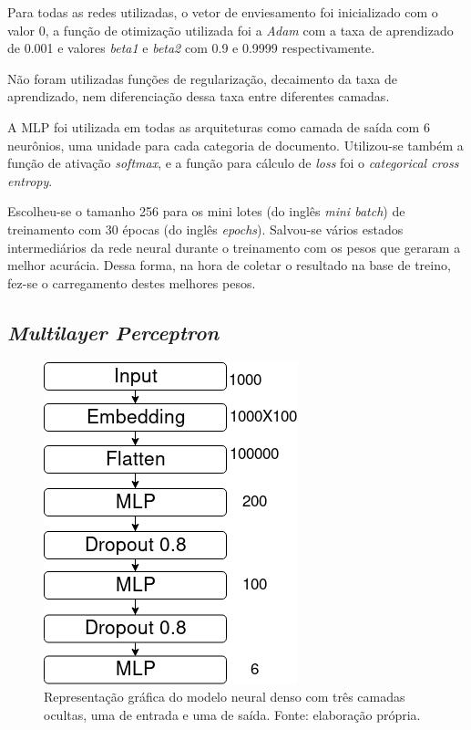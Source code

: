 Para todas as redes utilizadas, o vetor de enviesamento foi inicializado com o valor 0, a função de otimização utilizada foi a \textit{Adam} com a taxa de aprendizado
de 0.001 e valores \textit{beta1} e \textit{beta2} com 0.9 e 0.9999 respectivamente. 

Não foram utilizadas funções de regularização, decaimento da taxa de
aprendizado, nem diferenciação dessa taxa entre diferentes camadas.

A MLP foi utilizada em todas as arquiteturas como camada de saída com 6 neurônios, uma
unidade para cada categoria de documento. Utilizou-se também a função de ativação \textit{softmax},
e a função para cálculo de \textit{loss}  foi o \textit{categorical
cross entropy}.

Escolheu-se o tamanho 256 para os mini lotes (do inglês \textit{mini batch}) de treinamento com 30 épocas (do inglês \textit{epochs}). Salvou-se vários estados intermediários da rede neural durante o treinamento com os pesos que geraram a melhor acurácia. Dessa forma, na hora de coletar o resultado na base de treino, fez-se o carregamento destes melhores pesos.

\subsection{\textit{Multilayer Perceptron}}

\begin{figure}[ht]
    \centering
    \includegraphics[keepaspectratio=true,scale=0.5]{figuras/modelos-Dense}
    \caption[Modelo MLP]{Representação gráfica do modelo neural denso com três camadas ocultas, uma de entrada e uma de saída. Fonte: elaboração própria.}
    \label{fig:mlp}
\end{figure}

